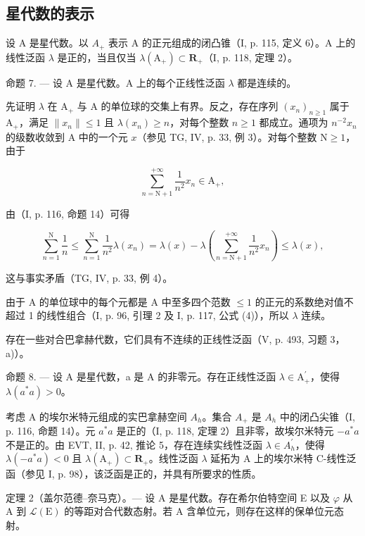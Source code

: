 \subsection{星代数的表示}

设 A 是星代数。以 \(A_{+}\) 表示 A 的正元组成的闭凸锥（I, p. 115, 定义 6）。A 上的线性泛函 \(\lambda\) 是正的，当且仅当 \(\lambda(\mathrm{A}_{+}) \subset \mathbf{R}_{+}\)（I, p. 118, 定理 2）。

命题 7. --- 设 A 是星代数。A 上的每个正线性泛函 \(\lambda\) 都是连续的。

先证明 \(\lambda\) 在 \(\mathrm{A}_{+}\) 与 A 的单位球的交集上有界。反之，存在序列 \((x_{n})_{n\geqslant 1}\) 属于 \(\mathrm{A}_{+}\)，满足 \(\| x_n\| \leqslant 1\) 且 \(\lambda (x_n)\geqslant n\)，对每个整数 \(n\geqslant 1\) 都成立。通项为 \(n^{-2}x_{n}\) 的级数收敛到 A 中的一个元 \(x\)（参见 TG, IV, p. 33, 例 3）。对每个整数 \(\mathrm{N}\geqslant 1\)，由于

\[
\sum_ {n = \mathrm{N} + 1} ^ {+ \infty} \frac {1}{n ^ {2}} x _ {n} \in \mathrm{A} _ {+},
\]

由（I, p. 116, 命题 14）可得

\[
\sum_ {n = 1} ^ {\mathrm{N}} \frac {1}{n} \leqslant \sum_ {n = 1} ^ {\mathrm{N}} \frac {1}{n ^ {2}} \lambda (x _ {n}) = \lambda (x) - \lambda \left(\sum_ {n = \mathrm{N} + 1} ^ {+ \infty} \frac {1}{n ^ {2}} x _ {n}\right) \leqslant \lambda (x),
\]

这与事实矛盾（TG, IV, p. 33, 例 4）。

由于 A 的单位球中的每个元都是 A 中至多四个范数 \(\leqslant 1\) 的正元的系数绝对值不超过 1 的线性组合（I, p. 96, 引理 2 及 I, p. 117, 公式 (4)），所以 \(\lambda\) 连续。

存在一些对合巴拿赫代数，它们具有不连续的正线性泛函（V, p. 493, 习题 3，a)）。

命题 8. --- 设 A 是星代数，a 是 A 的非零元。存在正线性泛函 \(\lambda \in \mathrm{A}_{+}^{\prime}\)，使得 \(\lambda(a^{*}a) > 0\)。

考虑 A 的埃尔米特元组成的实巴拿赫空间 \(A_{h}\)。集合 \(A_{+}\) 是 \(A_{h}\) 中的闭凸尖锥（I, p. 116, 命题 14）。元 \(a^{*}a\) 是正的（I, p. 118, 定理 2）且非零，故埃尔米特元 \(-a^{*}a\) 不是正的。由 EVT, II, p. 42, 推论 5，存在连续实线性泛函 \(\lambda\in A_{h}^{\prime}\)，使得 \(\lambda(-a^{*}a)<0\) 且 \(\lambda(\mathrm{A}_{+})\subset\mathbf{R}_{+}\)。线性泛函 \(\lambda\) 延拓为 A 上的埃尔米特 C-线性泛函（参见 I, p. 98），该泛函是正的，并具有所要求的性质。

定理 2（盖尔范德--奈马克）。--- 设 A 是星代数。存在希尔伯特空间 E 以及 \(\varphi\) 从 A 到 \(\mathcal{L}(\mathrm{E})\) 的等距对合代数态射。若 A 含单位元，则存在这样的保单位元态射。

